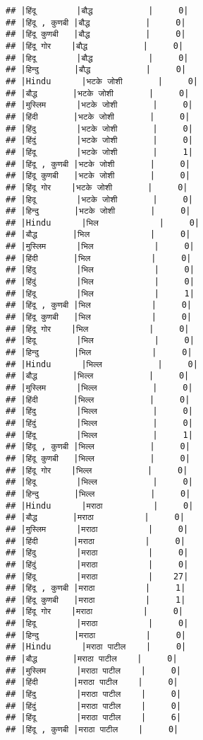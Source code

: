 \documentclass[
]{article}
\begin{document}
\begin{verbatim}
## |हिंदू        |बौद्ध           |     0|
## |हिंदू , कुणबी |बौद्ध           |     0|
## |हिंदू कुणबी   |बौद्ध           |     0|
## |हिंदू गोर    |बौद्ध           |     0|
## |हिदू        |बौद्ध           |     0|
## |हिन्दु       |बौद्ध           |     0|
## |Hindu      |भटके जोशी       |     0|
## |बौद्ध       |भटके जोशी       |     0|
## |मुस्लिम      |भटके जोशी       |     0|
## |हिंदी       |भटके जोशी       |     0|
## |हिंदु        |भटके जोशी       |     0|
## |हिंदुं        |भटके जोशी       |     0|
## |हिंदू        |भटके जोशी       |     1|
## |हिंदू , कुणबी |भटके जोशी       |     0|
## |हिंदू कुणबी   |भटके जोशी       |     0|
## |हिंदू गोर    |भटके जोशी       |     0|
## |हिदू        |भटके जोशी       |     0|
## |हिन्दु       |भटके जोशी       |     0|
## |Hindu      |भिल            |     0|
## |बौद्ध       |भिल            |     0|
## |मुस्लिम      |भिल            |     0|
## |हिंदी       |भिल            |     0|
## |हिंदु        |भिल            |     0|
## |हिंदुं        |भिल            |     0|
## |हिंदू        |भिल            |     1|
## |हिंदू , कुणबी |भिल            |     0|
## |हिंदू कुणबी   |भिल            |     0|
## |हिंदू गोर    |भिल            |     0|
## |हिदू        |भिल            |     0|
## |हिन्दु       |भिल            |     0|
## |Hindu      |भिल्ल           |     0|
## |बौद्ध       |भिल्ल           |     0|
## |मुस्लिम      |भिल्ल           |     0|
## |हिंदी       |भिल्ल           |     0|
## |हिंदु        |भिल्ल           |     0|
## |हिंदुं        |भिल्ल           |     0|
## |हिंदू        |भिल्ल           |     1|
## |हिंदू , कुणबी |भिल्ल           |     0|
## |हिंदू कुणबी   |भिल्ल           |     0|
## |हिंदू गोर    |भिल्ल           |     0|
## |हिदू        |भिल्ल           |     0|
## |हिन्दु       |भिल्ल           |     0|
## |Hindu      |मराठा          |     0|
## |बौद्ध       |मराठा          |     0|
## |मुस्लिम      |मराठा          |     0|
## |हिंदी       |मराठा          |     0|
## |हिंदु        |मराठा          |     0|
## |हिंदुं        |मराठा          |     0|
## |हिंदू        |मराठा          |    27|
## |हिंदू , कुणबी |मराठा          |     1|
## |हिंदू कुणबी   |मराठा          |     1|
## |हिंदू गोर    |मराठा          |     0|
## |हिदू        |मराठा          |     0|
## |हिन्दु       |मराठा          |     0|
## |Hindu      |मराठा पाटील    |     0|
## |बौद्ध       |मराठा पाटील    |     0|
## |मुस्लिम      |मराठा पाटील    |     0|
## |हिंदी       |मराठा पाटील    |     0|
## |हिंदु        |मराठा पाटील    |     0|
## |हिंदुं        |मराठा पाटील    |     0|
## |हिंदू        |मराठा पाटील    |     6|
## |हिंदू , कुणबी |मराठा पाटील    |     0|

\end{verbatim}
\end{document}
